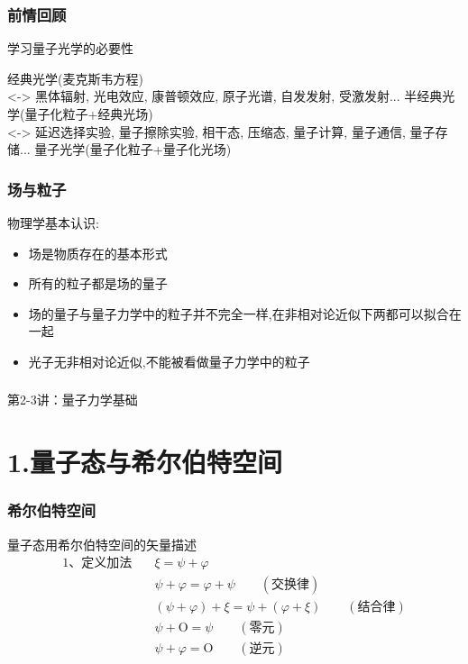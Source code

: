
\begin{frame}
    \frametitle{前情回顾}
    学习量子光学的必要性
    \begin{itemize}
        \Item 经典光学(麦克斯韦方程) \\
        <-> 黑体辐射, 光电效应, 康普顿效应, 原子光谱, 自发发射, 受激发射...
        \Item 半经典光学(量子化粒子+经典光场)  \\
        <-> 延迟选择实验, 量子擦除实验, 相干态, 压缩态, 量子计算, 量子通信, 量子存储...
        \Item 量子光学(量子化粒子+量子化光场)   
    \end{itemize}     
\end{frame}

\begin{frame}
    \frametitle{场与粒子}
    物理学基本认识:
    \begin{itemize}
        \item 场是物质存在的基本形式
        \item 所有的粒子都是场的量子
        \item 场的量子与量子力学中的粒子并不完全一样,在非相对论近似下两都可以拟合在一起
        \item 光子无非相对论近似,不能被看做量子力学中的粒子
    \end{itemize} 
\end{frame}

\begin{frame} [plain]
    \frametitle{}
    \Background[1] 
    \begin{center}
    {\huge 第2-3讲：量子力学基础}
    \end{center}  
    \addtocounter{framenumber}{-1}   
\end{frame}

\section{1.量子态与希尔伯特空间}

\begin{frame} 
    \frametitle{希尔伯特空间}
    量子态用希尔伯特空间的矢量描述\\
    \begin{equation*}
        \begin{split}
            \text{1、定义加法} \quad  &\xi=\psi+\varphi\\
            &\psi+\varphi=\varphi+\psi \qquad (\text{交换律})\\
            &(\psi+\varphi)+\xi=\psi+(\varphi+\xi) \qquad (\text{结合律})\\
            &\psi+\text{O}= \psi \qquad (\text{零元})\\
            &\psi+\varphi= \text{O} \qquad (\text{逆元})\\
        \end{split}  
    \end{equation*}
\end{frame} 

